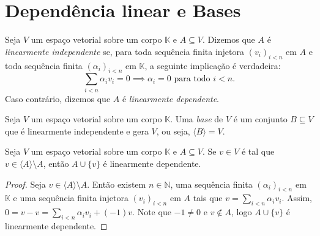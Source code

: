 \section{Dependência linear e Bases}

\begin{definition}
    Seja $V$ um espaço vetorial sobre um corpo $\mathbb K$ e $A \subseteq V$.
    Dizemos que $A$ é \emph{linearmente independente} se, para toda sequência finita injetora $(v_i)_{i<n}$ em $A$ e toda sequência finita $(\alpha_i)_{i<n}$ em $\mathbb K$, a seguinte implicação é verdadeira:
    \begin{equation*}
        \sum_{i<n} \alpha_i v_i = 0 \implies \alpha_i = 0 \text{ para todo } i<n.
    \end{equation*}
    Caso contrário, dizemos que $A$ é \emph{linearmente dependente}.
\end{definition}

\begin{definition}[Base]
    Seja $V$ um espaço vetorial sobre um corpo $\mathbb K$.
    Uma \emph{base} de $V$ é um conjunto $B \subseteq V$ que é linearmente independente e gera $V$, ou seja, $\langle B \rangle = V$.
\end{definition}

\begin{lemma}
    Seja $V$ um espaço vetorial sobre um corpo $\mathbb K$ e $A \subseteq V$.
    Se $v \in V$ é tal que $v \in \langle A\rangle\setminus A$, então $A\cup \{v\}$ é linearmente dependente.
\end{lemma}
\begin{proof}
    Seja $v \in \langle A\rangle\setminus A$.
    Então existem $n \in \mathbb N$, uma sequência finita $(\alpha_i)_{i<n}$ em $\mathbb K$ e uma sequência finita injetora $(v_i)_{i<n}$ em $A$ tais que $v = \sum_{i<n} \alpha_i v_i$.
    Assim, $0 = v - v = \sum_{i<n} \alpha_i v_i + (-1)v$.
    Note que $-1 \neq 0$ e $v \notin A$, logo $A \cup \{v\}$ é linearmente dependente.
\end{proof}

